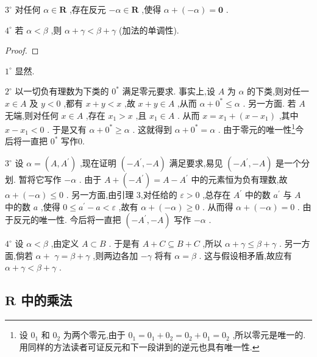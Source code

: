 \({3}^{ \circ  }\) 对任何 \(\alpha  \in  \mathbf{R}\) ,存在反元 \(- \alpha  \in  \mathbf{R}\) ,使得 \(\alpha  + \left( {-\alpha }\right)  = \mathbf{0}\) .

\({4}^{ \circ  }\) 若 \(\alpha  < \beta\) ,则 \(\alpha  + \gamma  < \beta  + \gamma\) (加法的单调性).

\begin{proof}

\end{proof}
\({1}^{ \circ  }\) 显然.

\({2}^{ \circ  }\) 以一切负有理数为下类的 \({0}^{ * }\) 满足零元要求. 事实上,设 \(A\) 为 \(\alpha\) 的下类,则对任一 \(x \in  A\) 及 \(y < 0\) ,都有 \(x + y < x\) ,故 \(x + y \in  A\) ,从而 \(\alpha  + {0}^{ * } \leq  \alpha\) . 另一方面. 若 \(A\) 无端,则对任何 \(x \in  A\) ,存在 \({x}_{1} > x\) ,且 \({x}_{1} \in  A\) . 从而 \(x = {x}_{1} + \left( {x - {x}_{1}}\right)\) ,其中 \(x - {x}_{1} < 0\) . 于是又有 \(\alpha  + {0}^{ * } \geq  \alpha\) . 这就得到 \(\alpha  + {0}^{ * } = \alpha\) . 由于零元的唯一性\footnote{设 \({0}_{1}\) 和 \({0}_{2}\) 为两个零元,由于 \({0}_{1} = {0}_{1} + {0}_{2} = {0}_{2} + {0}_{1} = {0}_{2}\) ,所以零元是唯一的.用同样的方法读者可证反元和下一段讲到的逆元也具有唯一性.}今后将一直把 \({0}^{ * }\) 写作0.

\({3}^{ \circ  }\) 设 \(\alpha  = \left( {A,{A}^{\prime }}\right)\) ,现在证明 \(\left( {-{A}^{\prime }, - A}\right)\) 满足要求,易见 \(\left( {-{A}^{\prime }, - A}\right)\) 是一个分划. 暂将它写作 \(- \alpha\) . 由于 \(A + \left( {-{A}^{\prime }}\right)  = A - {A}^{\prime }\) 中的元素恒为负有理数,故 \(\alpha  + \left( {-\alpha }\right)  \leq  0\) . 另一方面,由引理 3,对任给的 \(\varepsilon  > 0\) ,总存在 \({A}^{\prime }\) 中的数 \({a}^{\prime }\) 与 \(A\) 中的数 \(a\) ,使得 \(0 \leq  {a}^{\prime } - a < \varepsilon\) ,故有 \(\alpha  + \left( {-\alpha }\right)  \geq  0\) . 从而得 \(\alpha  + \left( {-\alpha }\right)  = 0\) . 由于反元的唯一性. 今后将一直把 \(\left( {-{A}^{\prime }, - A}\right)\) 写作 \(- \alpha\) .

\({4}^{ \circ  }\) 设 \(\alpha  < \beta\) ,由定义 \(A \subset  B\) . 于是有 \(A + C \subseteq  B + C\) ,所以 \(\alpha  + \gamma  \leq  \beta  + \gamma\) . 另一方面,倘若 \(\alpha  +\)  \(\gamma  = \beta  + \gamma\) ,则两边各加 \(- \gamma\) 将有 \(\alpha  = \beta\) . 这与假设相矛盾,故应有 \(\alpha  + \gamma  < \beta  + \gamma\) .

\subsection{ \(\mathbf{R}\) 中的乘法}


